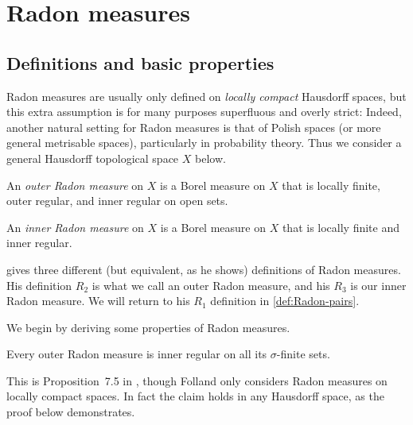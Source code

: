 \documentclass[article, a4paper, 11pt, oneside]{memoir}
\numberwithin{equation}{chapter}
\begin{document}
\chapter{Radon measures}

\section{Definitions and basic properties}

Radon measures are usually only defined on \emph{locally compact} Hausdorff spaces, but this extra assumption is for many purposes superfluous and overly strict: Indeed, another natural setting for Radon measures is that of Polish spaces (or more general metrisable spaces), particularly in probability theory. Thus we consider a general Hausdorff topological space $X$ below.

\newcommand{\calM}{\mathcal{M}}
\newcommand{\radonout}{\calM^{+}}
\newcommand{\radonin}{\calM^{-}}

\begin{definition}
    \label{def:Radon-measures}
    An \emph{outer Radon measure} on $X$ is a Borel measure on $X$ that is locally finite, outer regular, and inner regular on open sets.

    An \emph{inner Radon measure} on $X$ is a Borel measure on $X$ that is locally finite and inner regular.
\end{definition}
%
\textcite{schwartz1973} gives three different (but equivalent, as he shows) definitions of Radon measures. His definition $R_2$ is what we call an outer Radon measure, and his $R_3$ is our inner Radon measure. We will return to his $R_1$ definition in \cref{def:Radon-pairs}.

We begin by deriving some properties of Radon measures.


\begin{proposition}
    \label{thm:outer-Radon-inner-regular-on-finites}
    Every outer Radon measure is inner regular on all its $\sigma$-finite sets.
\end{proposition}
%
This is Proposition~7.5 in \textcite{folland2007}, though Folland only considers Radon measures on locally compact spaces. In fact the claim holds in any Hausdorff space, as the proof below demonstrates.
\end{document}
